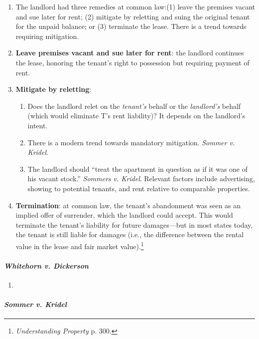 \begin{enumerate}
    \item The landlord had three remedies at common law:(1) leave the premises 
    vacant and sue later for rent; (2) mitigate by reletting and suing the 
    original tenant for the unpaid balance; or (3) terminate the lease. There 
    is a trend towards requiring mitigation.
    \item \textbf{Leave premises vacant and sue later for rent}: the landlord 
    continues the lease, honoring the tenant's right to possession but 
    requiring payment of rent.
    \item \textbf{Mitigate by reletting}:
    \begin{enumerate}
        \item Does the landlord relet on the \emph{tenant's} behalf or the 
        \emph{landlord's} behalf (which would eliminate T's rent liability)? 
        It depends on the landlord's intent.
        \item There is a modern trend towards mandatory mitigation. 
        \emph{Sommer v. Kridel}.
        \item The landlord should ``treat the apartment in question as if it 
        was one of his vacant stock.'' \emph{Sommers v.  Kridel}.  Relevant 
        factors include advertising, showing to potential tenants, and rent 
        relative to comparable properties.
    \end{enumerate}
    \item \textbf{Termination}: at common law, the tenant's abandonment was 
    seen as an implied offer of surrender, which the landlord could accept. 
    This would terminate the tenant's liability for future damages---but in 
    most states today, the tenant is still liable for damages (i.e., the 
    difference between the rental value in the lease and fair market 
    value).\footnote{\emph{Understanding Property} p. 300.}
\end{enumerate}

\paragraph{\emph{Whitehorn v. Dickerson}} %

\begin{enumerate}
    \item 
\end{enumerate}

\paragraph{\emph{Sommer v. Kridel}}

